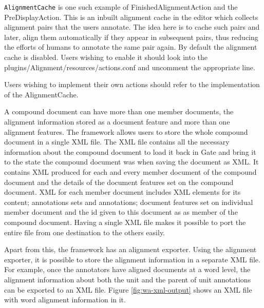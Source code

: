 {\tt AlignmentCache} is one such example of FinishedAlignmentAction and the
PreDisplayAction.  This is an inbuilt alignment cache in the editor which 
collects alignment pairs that the users annotate. The idea here is to cache such
pairs and later, align them automatically if they appear in subsequent pairs, 
thus reducing the efforts of humans to annotate the same pair again.  By default
the alignment cache is disabled. Users wishing to enable it should look into the
plugins/Alignment/resources/actions.conf and uncomment the appropriate line.

Users wishing to implement their own actions should refer to the implementation
of the AlignmentCache.


A compound document can have more than one member documents, the alignment 
information stored as a document feature and more than one alignment features.
The framework allows users to store the whole compound document in a single XML 
file.  The XML file contains all the necessary information about the compound
document to load it back in Gate and bring it to the state the compound document
was when saving the document as XML.  It contains XML produced for each and 
every member document of the compound document and the details of the document 
features set on the compound document.  XML for each member document includes 
XML elements for its content; annotations sets and annotations; document 
features set on individual member document and the id given to this document as 
as member of the compound document.  Having a single XML file makes it possible
to port the entire file from one destination to the others easily.

Apart from this, the framework has an alignment exporter. Using the alignment 
exporter, it is possible to store the alignment information in a separate XML 
file. For example, once the annotators have aligned documents at a word level, 
the alignment information about both the unit and the parent of unit annotations 
can be exported to an XML file.  Figure \ref{fig:wa-xml-output} shows an XML 
file with word alignment information in it.

